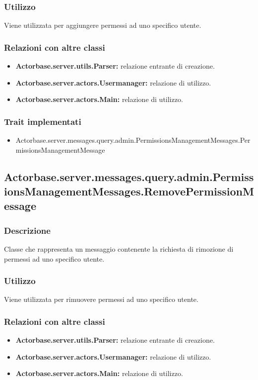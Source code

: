 \documentclass[a4paper]{article}
\begin{document}
			\subsubsection{Utilizzo}
				Viene utilizzata per aggiungere permessi ad uno specifico utente.
				
			\subsubsection{Relazioni con altre classi}
				\begin{itemize}
					\item \textbf{Actorbase.server.utils.Parser:} relazione entrante di creazione.
					\item \textbf{Actorbase.server.actors.Usermanager:} relazione di utilizzo.
					\item \textbf{Actorbase.server.actors.Main:} relazione di utilizzo.
				\end{itemize}
			\subsubsection{Trait implementati}
				\begin{itemize}
					\item Actorbase.server.messages.query.admin.PermissionsManagementMessages.PermissionsManagementMessage
				\end{itemize}
		
		\subsection{Actorbase.server.messages.query.admin.PermissionsManagementMessages.RemovePermissionMessage}
			\subsubsection{Descrizione}
				Classe che rappresenta un messaggio contenente la richiesta di rimozione di permessi ad uno specifico utente.
				
			\subsubsection{Utilizzo}
				Viene utilizzata per rimuovere permessi ad uno specifico utente.
				
			\subsubsection{Relazioni con altre classi}
				\begin{itemize}
					\item \textbf{Actorbase.server.utils.Parser:} relazione entrante di creazione.
					\item \textbf{Actorbase.server.actors.Usermanager:} relazione di utilizzo.
					\item \textbf{Actorbase.server.actors.Main:} relazione di utilizzo.
				\end{itemize}
\end{document}
